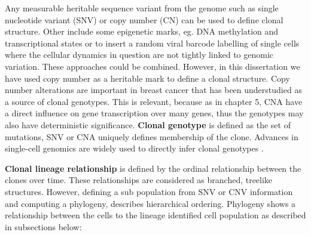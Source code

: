 Any measurable heritable sequence variant from the genome such as single nucleotide variant (SNV) or copy number (CN) can be used to define clonal structure. 
Other include some epigenetic marks, eg. DNA methylation and transcriptional states or to insert a random viral barcode labelling of single cells where the cellular dynamics in question are not tightly linked to genomic variation. These approaches could be combined. However, in this dissertation we have used copy number as a heritable mark to define a clonal structure. Copy number alterations are important in breast cancer \cite{zhang2009copy, pollack2002microarray}
that has been understudied as a source of clonal genotypes. This is relevant, because as in chapter 5, CNA have a direct influence on gene transcription over many genes, thus the genotypes may also have deterministic significance. \textbf{Clonal genotype} is defined as the set of mutations, SNV or CNA uniquely defines membership of the clone. Advances in single-cell genomics are widely used to directly infer clonal genotypes \cite{macosko2015highly,laks2019clonal}. 

 \textbf{Clonal lineage relationship} is defined by the ordinal relationship between the clones over time. These relationships are considered as branched, treelike structures. However, defining a sub population from SNV or CNV information and computing a phylogeny, describes hierarchical ordering. Phylogeny shows a relationship between the cells to the lineage identified cell population as described in subsections below:
 
